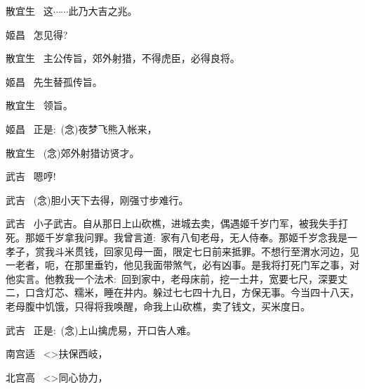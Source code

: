 {散宜生\hspace{20pt}~ 这$\cdots{}\cdots{}$此乃大吉之兆。

姬昌\hspace{30pt}~ 怎见得?

散宜生\hspace{20pt}~ 主公传旨，郊外射猎，不得虎臣，必得良将。

姬昌\hspace{30pt}~ 先生替孤传旨。

散宜生\hspace{20pt}~ 领旨。

姬昌\hspace{30pt}~ 正是:~({\akai 念})夜梦飞熊入帐来，

	散宜生\hspace{20pt}~ ({\akai 念})郊外射猎访贤才。

\vspace{5pt}

武吉\hspace{30pt}~ 嗯哼!

武吉\hspace{30pt}~ ({\akai 念})胆小天下去得，刚强寸步难行。

\setlength{\hangindent}{60pt}   %
{武吉\hspace{30pt}~ 小子武吉。自从那日上山砍樵，进城去卖，偶遇姬千岁门军，被我失手打死。那姬千岁拿我问罪。我曾言道:~家有八旬老母，无人侍奉。那姬千岁念我是一孝子，赏我斗米贯钱，回家见母一面，限定七日前来抵罪。不想行至渭水河边，见一老者，呃，在那里垂钓，他见我面带煞气，必有凶事。是我将打死门军之事，对他实言。他教我一个法术:~回到家中，老母床前，挖一土井，宽要七尺，深要丈二，口含灯芯、糯米，睡在井内。躲过七七四十九日，方保无事。今当四十八天，老母腹中饥饿，只得将我唤醒，命我上山砍樵，卖了钱文，买米度日。}

武吉\hspace{30pt}~ 正是:~({\akai 念})上山擒虎易，开口告人难。

\vspace{5pt}

	南宫适\hspace{20pt}~ \textless{}\!\textgreater{}扶保西岐，

北宫高\hspace{20pt}~  \textless{}\!\textgreater{}同心协力，

}
